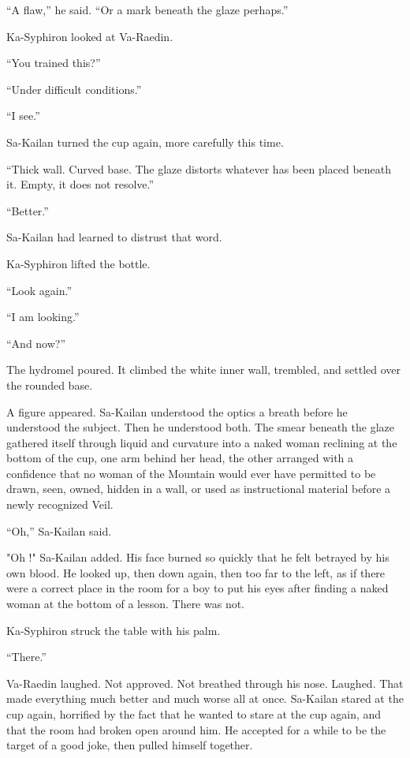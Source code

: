 “A flaw,” he said. “Or a mark beneath the glaze perhaps.”\par
Ka-Syphiron looked at Va-Raedin.\par
“You trained this?”\par
“Under difficult conditions.”\par
“I see.”\par
Sa-Kailan turned the cup again, more carefully this time.\par
“Thick wall. Curved base. The glaze distorts whatever has been placed beneath it. Empty, it does not resolve.”\par
“Better.”\par
Sa-Kailan had learned to distrust that word.\par
Ka-Syphiron lifted the bottle.\par
“Look again.”\par
“I am looking.”\par
“And now?”\par


The hydromel poured. It climbed the white inner wall, trembled, and settled over the rounded base.\par
A figure appeared.
Sa-Kailan understood the optics a breath before he understood the subject.
Then he understood both.
The smear beneath the glaze gathered itself through liquid and curvature into a naked woman reclining at the bottom of the cup, one arm behind her head, the other arranged with a confidence that no woman of the Mountain would ever have permitted to be drawn, seen, owned, hidden in a wall, or used as instructional material before a newly recognized Veil.\par
“Oh,” Sa-Kailan said.\par
"Oh !" Sa-Kailan added.
His face burned so quickly that he felt betrayed by his own blood. 
He looked up, then down again, then too far to the left, as if there were a correct place in the room for a boy to put his eyes after finding a naked woman at the bottom of a lesson.
There was not.\par
Ka-Syphiron struck the table with his palm.\par
“There.”\par

Va-Raedin laughed. Not approved. Not breathed through his nose. Laughed. 
That made everything much better and much worse all at once.
Sa-Kailan stared at the cup again, horrified by the fact that he wanted to stare at the cup again, and that the room had broken open around him.
He accepted for a while to be the target of a good joke, then pulled himself together. \par

